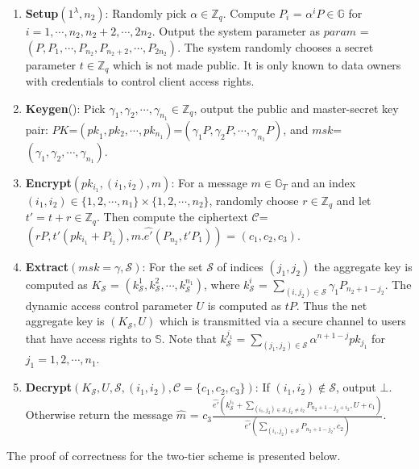 \begin{enumerate}
 \item \textbf{Setup}$(1^{\lambda},n_2)$: Randomly pick $\alpha \in \mathbb{Z}_q$. Compute $P_i$ = ${\alpha^{i}}P \in \mathbb{G}$ for $i = 1,\cdots,n_2,n_2+2,\cdots,2n_2$. Output the system parameter as $param$ = $(P,P_1,\cdots,P_{n_2},P_{n_2+2},\cdots,P_{2n_2})$. The system randomly chooses a secret parameter $t \in \mathbb{Z}_q$ which is not made public. It is only known to data owners with credentials to control client access rights.
 \item \textbf{Keygen}(): Pick $\gamma_1,\gamma_2,\cdots,\gamma_{n_1} \in \mathbb{Z}_q$, output the public and master-secret key pair: $PK$=$({pk}_1,pk_{2},\cdots,pk_{n_1})$=$(\gamma_1P,\gamma_2P,\cdots,\gamma_{n_1}P)$, and $msk$=$(\gamma_1,\gamma_2,\cdots,\gamma_{n_1})$.
 \item \textbf{Encrypt}$(pk_{i_1},(i_1,i_2),m)$: For a message $m \in \mathbb{G}_T$ and an index $(i_1,i_2) \in \{1,2,\cdots,n_1\}\times\{1,2,\cdots,n_2\}$, randomly choose $r\in\mathbb{Z}_q$ and let $t'=t+r \in\mathbb{Z}_q$. Then compute the ciphertext $\mathcal{C}$=$(rP,t'{(pk_{i_1}+P_{i_2})},m.\hat{e'}(P_{n_2},t'P_1))$ = $(c_1,c_2,c_3)$.
 \item \textbf{Extract}$(msk=\gamma,\mathcal{S})$: For the set $\mathcal{S}$ of indices $(j_1,j_2)$ the aggregate key is computed as $K_{\mathcal{S}}$ = $(k^{1}_{\mathcal{S}},k^{2}_{\mathcal{S}},\cdots,k^{n_1}_{\mathcal{S}})$, where $k^{i}_{\mathcal{S}}$ = $\sum_{(i,j_2)\in\mathcal{S}}{\gamma_{1}}P_{n_2+1-j_2}$. The dynamic access control parameter $U$ is computed as $tP$. Thus the net aggregate key is $(K_{\mathcal{S}},U)$ which is transmitted via a secure channel to users that have access rights to $\mathbb{S}$. Note that  $k^{j_1}_{\mathcal{S}}=\sum_{(j_1,j_2)\in\mathcal{S}}\alpha^{n+1-j}pk_{j_1}$ for $j_1=1,2,\cdots,n_1$. 
 \item \textbf{Decrypt}$(K_{\mathcal{S}}, U, \mathcal{S},(i_1,i_2),\mathcal{C}=\{c_1,c_2,c_3\})$: If $(i_1,i_2)\notin\mathcal{S}$, output $\bot$. Otherwise return the message $\hat{m}$ = $c_3\frac{\hat{e'}(k^{i_1}_{\mathcal{S}}+\sum_{(i_1,j_2)\in\mathcal{S},j_2\neq i_2}P_{n_2+1-j_2+i_2},U+c_1)}{\hat{e'}(\sum_{(i_1,j_2)\in\mathcal{S}}P_{n_2+1-j_2},c_2)}$. 
\end{enumerate}

The proof of correctness for the two-tier scheme is presented below.

